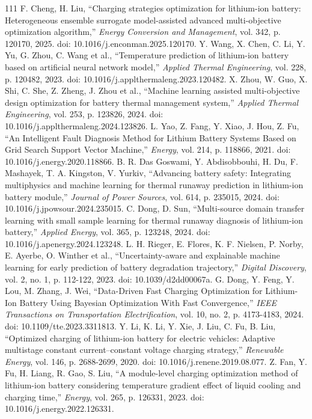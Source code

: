 \documentclass[journal]{IEEEtran}
\begin{document}
\begin{thebibliography}{111}
F. Cheng, H. Liu, ``Charging strategies optimization for lithium-ion battery: Heterogeneous ensemble surrogate model-assisted advanced multi-objective optimization algorithm,'' \emph{Energy Conversion and Management}, vol. 342, p. 120170, 2025. doi: 10.1016/j.enconman.2025.120170.
Y. Wang, X. Chen, C. Li, Y. Yu, G. Zhou, C. Wang et al., ``Temperature prediction of lithium-ion battery based on artificial neural network model,'' \emph{Applied Thermal Engineering}, vol. 228, p. 120482, 2023. doi: 10.1016/j.applthermaleng.2023.120482.
X. Zhou, W. Guo, X. Shi, C. She, Z. Zheng, J. Zhou et al., ``Machine learning assisted multi-objective design optimization for battery thermal management system,'' \emph{Applied Thermal Engineering}, vol. 253, p. 123826, 2024. doi: 10.1016/j.applthermaleng.2024.123826.
L. Yao, Z. Fang, Y. Xiao, J. Hou, Z. Fu, ``An Intelligent Fault Diagnosis Method for Lithium Battery Systems Based on Grid Search Support Vector Machine,'' \emph{Energy}, vol. 214, p. 118866, 2021. doi: 10.1016/j.energy.2020.118866.
B. R. Das Goswami, Y. Abdisobbouhi, H. Du, F. Mashayek, T. A. Kingston, V. Yurkiv, ``Advancing battery safety: Integrating multiphysics and machine learning for thermal runaway prediction in lithium-ion battery module,'' \emph{Journal of Power Sources}, vol. 614, p. 235015, 2024. doi: 10.1016/j.jpowsour.2024.235015.
C. Dong, D. Sun, ``Multi-source domain transfer learning with small sample learning for thermal runaway diagnosis of lithium-ion battery,'' \emph{Applied Energy}, vol. 365, p. 123248, 2024. doi: 10.1016/j.apenergy.2024.123248.
L. H. Rieger, E. Flores, K. F. Nielsen, P. Norby, E. Ayerbe, O. Winther et al., ``Uncertainty-aware and explainable machine learning for early prediction of battery degradation trajectory,'' \emph{Digital Discovery}, vol. 2, no. 1, p. 112-122, 2023. doi: 10.1039/d2dd00067a.
G. Dong, Y. Feng, Y. Lou, M. Zhang, J. Wei, ``Data-Driven Fast Charging Optimization for Lithium-Ion Battery Using Bayesian Optimization With Fast Convergence,'' \emph{IEEE Transactions on Transportation Electrification}, vol. 10, no. 2, p. 4173-4183, 2024. doi: 10.1109/tte.2023.3311813.
Y. Li, K. Li, Y. Xie, J. Liu, C. Fu, B. Liu, ``Optimized charging of lithium-ion battery for electric vehicles: Adaptive multistage constant current--constant voltage charging strategy,'' \emph{Renewable Energy}, vol. 146, p. 2688-2699, 2020. doi: 10.1016/j.renene.2019.08.077.
Z. Fan, Y. Fu, H. Liang, R. Gao, S. Liu, ``A module-level charging optimization method of lithium-ion battery considering temperature gradient effect of liquid cooling and charging time,'' \emph{Energy}, vol. 265, p. 126331, 2023. doi: 10.1016/j.energy.2022.126331.

\end{thebibliography}
\end{document}

